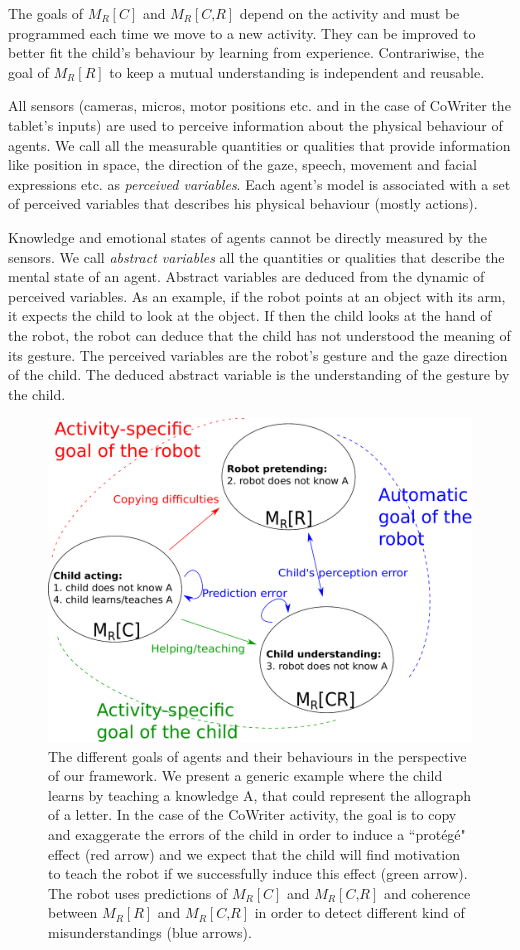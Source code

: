 \documentclass[10pt,a4paper]{article}
\begin{document}
The goals of $ M_R\left[\textit{C}\right]$ and $ M_R\left[\textit{C,R}\right]$ depend on the activity and must be programmed each time we move to a new activity. They can be improved to better fit the child's behaviour by learning from experience. Contrariwise, the goal of $ M_R\left[\textit{R}\right]$ to keep a mutual understanding is independent and reusable. 

All sensors (cameras, micros, motor positions etc. and in the case of CoWriter the tablet's inputs) are used to perceive information about the physical behaviour of agents. 
We call all the measurable quantities or qualities that provide information like position in space, the direction of the gaze, speech, movement and facial expressions etc. as \textit{perceived variables}. 
Each agent's model is associated with a set of perceived variables that describes his physical behaviour (mostly actions).

Knowledge and emotional states of agents cannot be directly measured by the  sensors. 
We call \textit{abstract variables} all the quantities or qualities that describe the mental state of an agent. 
Abstract variables are deduced from the dynamic of perceived variables. 
As an example, if the robot points at an object with its arm, it expects the child to look at the object. 
If then the child looks at the hand of the robot, the robot can deduce that the child has not understood the meaning of its gesture. 
The perceived variables are the robot's gesture and the gaze direction of the child. 
The deduced abstract variable is the understanding of the gesture by the child. 


\begin{figure}[!]
\centering
\includegraphics[width=0.6\columnwidth]{mutual_behaviour}
\caption{\small The different goals of agents and their behaviours in the perspective of our framework. We present a generic example where the child learns by teaching a knowledge A, that could represent the allograph of a letter. In the case of the CoWriter activity, the goal is to copy and exaggerate the errors of the child in order to induce a ``prot\'eg\'e" effect (red arrow) and we expect that the child will find motivation to teach the robot if we successfully induce this effect (green arrow). The robot uses predictions of $ M_R\left[\textit{C}\right]$ and $ M_R\left[\textit{C,R}\right]$ and coherence between $ M_R\left[\textit{R}\right]$ and $ M_R\left[\textit{C,R}\right]$ in order to detect different kind of misunderstandings (blue arrows).}
\label{mm}
\end{figure} 
\end{document}

